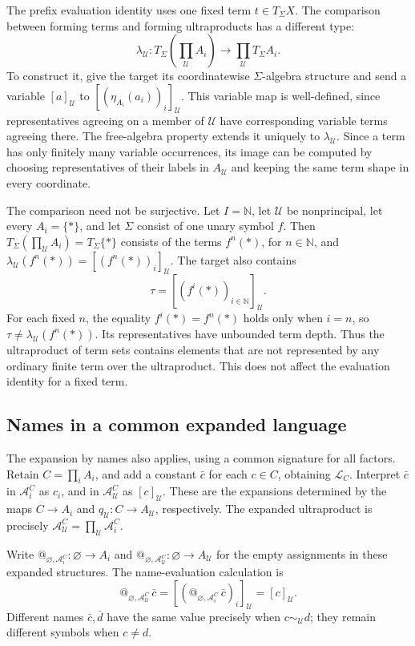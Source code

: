 \documentclass[11pt]{article}
\makeatletter
\newcommand{\atsign}{\mathord{@}}
\theoremstyle{definition}
\makeatother
\begin{document}
The prefix evaluation identity uses one fixed term
\(t\in T_\Sigma X\). The comparison between forming terms and forming
ultraproducts has a different type:
\[
\lambda_{\mathcal U}:
T_\Sigma\!\left(\prod_{\mathcal U}A_i\right)
\longrightarrow
\prod_{\mathcal U}T_\Sigma A_i.
\]
To construct it, give the target its coordinatewise
\(\Sigma\)-algebra structure and send a variable
\([a]_{\mathcal U}\) to
\([(\eta_{A_i}(a_i))_i]_{\mathcal U}\).
This variable map is well-defined, since representatives agreeing on
a member of \(\mathcal U\) have corresponding variable terms agreeing
there. The free-algebra property extends it uniquely to
\(\lambda_{\mathcal U}\).
Since a term has only finitely many variable occurrences, its image can
be computed by choosing representatives of their labels in
\(A_{\mathcal U}\) and keeping the same term shape in every coordinate.

The comparison need not be surjective. Let \(I=\mathbb N\), let
\(\mathcal U\) be nonprincipal, let every \(A_i=\{*\}\), and let
\(\Sigma\) consist of one unary symbol \(f\). Then
\(T_\Sigma(\prod_{\mathcal U}A_i)=T_\Sigma\{*\}\) consists of the terms
\(f^n(*)\), for \(n\in\mathbb N\), and
\(\lambda_{\mathcal U}(f^n(*))=[(f^n(*))_i]_{\mathcal U}\).
The target also contains
\[
\tau=[(f^i(*))_{i\in\mathbb N}]_{\mathcal U}.
\]
For each fixed \(n\), the equality \(f^i(*)=f^n(*)\) holds only when
\(i=n\), so \(\tau\neq\lambda_{\mathcal U}(f^n(*))\).
Its representatives have unbounded term depth.
Thus the ultraproduct of term sets contains elements that are not
represented by any ordinary finite term over the ultraproduct.
This does not affect the evaluation identity for a fixed term.

\subsection{Names in a common expanded language}

The expansion by names also applies, using a common signature for all
factors. Retain \(C=\prod_i A_i\), and add a constant \(\bar c\) for
each \(c\in C\), obtaining \(\mathcal L_C\).
Interpret \(\bar c\) in \(\mathcal A_i^C\) as \(c_i\), and in
\(\mathcal A_{\mathcal U}^C\) as \([c]_{\mathcal U}\).
These are the expansions determined by the maps
\(C\to A_i\) and \(q_{\mathcal U}:C\to A_{\mathcal U}\), respectively.
The expanded ultraproduct is precisely
\(\mathcal A_{\mathcal U}^C=\prod_{\mathcal U}\mathcal A_i^C\).

Write \(\atsign_{\varnothing,\mathcal A_i^C}:\varnothing\to A_i\) and
\(\atsign_{\varnothing,\mathcal A_{\mathcal U}^C}:\varnothing\to A_{\mathcal U}\)
for the empty assignments in these expanded structures. The name-evaluation calculation is
\[
\atsign_{\varnothing,\mathcal A_{\mathcal U}^C}\,\bar c
=[(\atsign_{\varnothing,\mathcal A_i^C}\,\bar c)_i]_{\mathcal U}
=[c]_{\mathcal U}.
\]
Different names \(\bar c,\bar d\) have the same value precisely when
\(c\sim_{\mathcal U}d\); they remain different symbols when \(c\neq d\).
\end{document}
